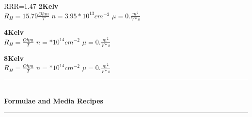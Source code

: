 \documentclass[idxtotoc,hyperref,openany,oneside]{labbook} %
\newcommand{\HRule}{\rule{\linewidth}{0.5mm}} %
\begin{document}
RRR=1.47
\newline
\newline
\normalsize \textbf{2Kelv}\\
$R_H=15.79\frac{Ohm}{T}$
\newline
$n=3.95*10^{13} cm^{-2}$
\newline
$\mu= 0.\frac{m^2}{V*s}$
\newline
\newline


\normalsize \textbf{4Kelv}\\
$R_H= \frac{Ohm}{T}$
\newline
$n=*10^{14} cm^{-2}$
\newline
$\mu= 0.\frac{m^2}{V*s}$
\newline
\newline

\normalsize \textbf{8Kelv}\\
$R_H= \frac{Ohm}{T}$
\newline
$n=*10^{14} cm^{-2}$
\newline
$\mu= 0.\frac{m^2}{V*s}$
\newline
\newline




\labday{} %

\begin{center}
\HRule \\[0.4cm]
{\huge \textbf{Formulae and Media Recipes}}\\[0.4cm] %
\HRule \\[1.5cm]
\end{center}


\newpage
\end{document}
